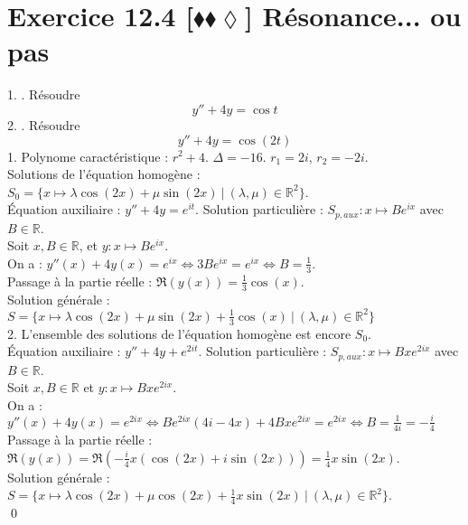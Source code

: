 \documentclass[10pt]{article}
\begin{document}
\section*{Exercice 12.4 [$\blacklozenge\blacklozenge\lozenge$] Résonance... ou pas}
\begin{tcolorbox}[enhanced, width=7in, center, size=fbox, fontupper=\large, drop shadow southwest]
    1. . Résoudre
    \begin{equation*}
        y'' + 4y = \cos t
    \end{equation*}
    2. . Résoudre
    \begin{equation*}
        y'' + 4y = \cos(2t)
    \end{equation*}
    1. Polynome caractéristique : $r^2 + 4$. $\Delta=-16$. $r_1 = 2i$, $r_2=-2i$.\\
    Solutions de l'équation homogène : $S_0 = \{x\mapsto \lambda\cos(2x) + \mu\sin(2x) ~ | ~ (\lambda, \mu) \in \mathbb{R}^2\}$.\\
    Équation auxiliaire : $y'' + 4y = e^{it}$. Solution particulière : $S_{p,aux}:x\mapsto Be^{ix}$ avec $B\in\mathbb{R}$.\\
    Soit $x,B\in\mathbb{R}$, et $y:x\mapsto Be^{ix}$.\\
    On a : $y''(x) + 4y(x) = e^{ix} \iff 3Be^{ix} = e^{ix} \iff B = \frac{1}{3}$.\\
    Passage à la partie réelle : $\Re(y(x)) = \frac{1}{3}\cos(x)$.\\
    Solution générale : $S = \{x\mapsto \lambda \cos(2x) + \mu \sin(2x) + \frac{1}{3}\cos(x) ~ | ~ (\lambda, \mu) \in \mathbb{R}^2\}$\\[0.2cm]
    2. L'ensemble des solutions de l'équation homogène est encore $S_0$.\\
    Équation auxiliaire : $y'' + 4y + e^{2it}$. Solution particulière : $S_{p,aux}:x\mapsto Bxe^{2ix}$ avec $B\in\mathbb{R}$.\\
    Soit $x,B\in\mathbb{R}$ et $y:x\mapsto Bxe^{2ix}$.\\
    On a : $y''(x) + 4y(x) = e^{2ix} \iff Be^{2ix}(4i-4x) + 4Bxe^{2ix} = e^{2ix} \iff B=\frac{1}{4i}=-\frac{i}{4}$\\
    Passage à la partie réelle : $\Re(y(x)) = \Re\left( -\frac{i}{4}x(\cos(2x) + i\sin(2x)) \right)=\frac{1}{4}x\sin(2x)$.\\
    Solution générale : $S=\{x\mapsto \lambda\cos(2x) + \mu\cos(2x) + \frac{1}{4}x\sin(2x) ~ | ~ (\lambda, \mu)\in\mathbb{R}^2\}$.\\
    \qed
\end{tcolorbox}
\end{document}
